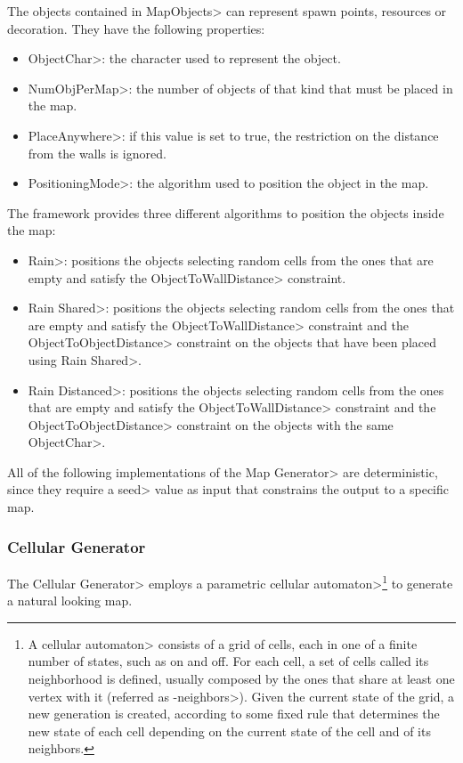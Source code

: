 \noindent The objects contained in \<MapObjects> can represent spawn points, resources or decoration. They have the following properties:

\begin{itemize}
\item \<ObjectChar>: the character used to represent the object.
\item \<NumObjPerMap>: the number of objects of that kind that must be placed in the map.
\item \<PlaceAnywhere>: if this value is set to true, the restriction on the distance from the walls is ignored.
\item \<PositioningMode>: the algorithm used to position the object in the map.
\end{itemize}

\noindent The framework provides three different algorithms to position the objects inside the map:

\begin{itemize}
\item \<Rain>: positions the objects selecting random cells from the ones that are empty and satisfy the \<ObjectToWallDistance> constraint.
\item \<Rain Shared>: positions the objects selecting random cells from the ones that are empty and satisfy the \<ObjectToWallDistance> constraint and the \<ObjectToObjectDistance> constraint on the objects that have been placed using \<Rain Shared>.
\item \<Rain Distanced>: positions the objects selecting random cells from the ones that are empty and satisfy the \<ObjectToWallDistance> constraint and the \<ObjectToObjectDistance> constraint on the objects with the same \<ObjectChar>.
\end{itemize}

All of the following implementations of the \<Map Generator> are deterministic, since they require a \<seed> value as input that constrains the output to a specific map.


\subsubsection{Cellular Generator}

The \<Cellular Generator> employs a parametric \<cellular automaton>\footnote{A \<cellular automaton> consists of a grid of cells, each in one of a finite number of states, such as on and off. For each cell, a set of cells called its neighborhood is defined, usually composed by the ones that share at least one vertex with it (referred as -neighbors>). Given the current state of the grid, a new generation is created, according to some fixed rule that determines the new state of each cell depending on the current state of the cell and of its neighbors.} to generate a natural looking map. 

